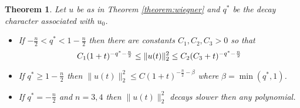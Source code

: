 \documentclass{amsart}
\newtheorem {Theorem}  {Theorem}
\numberwithin{Theorem}{section}
\numberwithin{equation}{section}
\theoremstyle{definition}
\theoremstyle{remark}
\begin{document}
\begin{Theorem}\label{cor:NSdecaycharacter}
Let $u$ be as in Theorem \ref{theorem:wiegner} and $q^*$ be the decay character associated with $u_0$.

\begin{itemize}
\item[1.]If $-\frac{n}{2}<q^*< 1-\frac{n}{2}$ then there are constants $C_1,C_2,C_3>0$ so that
\begin{equation}
C_1(1+t)^{-q^*-\frac{n}{2}} \leq \|u(t)\|_2^2 \leq C_2(C_3+t)^{-q^*-\frac{n}{2}}\notag
\end{equation}
\item[2.]If $q^*\geq 1-\frac{n}{2}$ then $\|u(t)\|_2^2\leq C(1+t)^{-\frac{n}{2}-\beta}$ where $\beta=\min(q^*,1)$.
\item[3.]If $q^*=-\frac{n}{2}$ and $n=3,4$ then $\|u(t)\|_2^2$ decays slower then any polynomial.
\end{itemize}

\end{Theorem}
\end{document}
